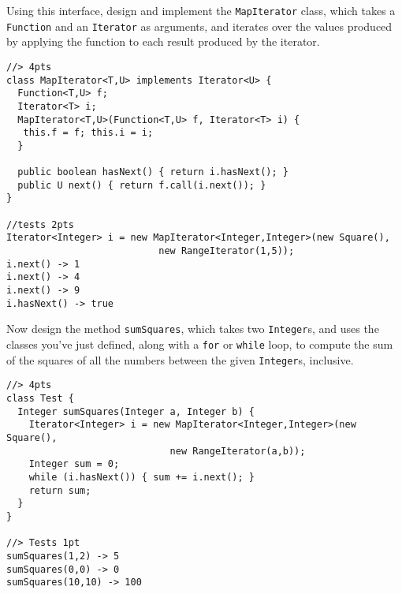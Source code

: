 \documentclass[12pt]{article}                   %
\newenvironment{solution}{\color{red}}{}
\begin{document}
\begin{problem}
Using this interface, design and implement the {\tt MapIterator}
class, which takes a \verb|Function| and an \verb|Iterator| as
arguments, and iterates over the values produced by applying the
function to each result produced by the iterator.

\ifrubric
\begin{solution}
\begin{verbatim}
//> 4pts
class MapIterator<T,U> implements Iterator<U> {
  Function<T,U> f;
  Iterator<T> i;
  MapIterator<T,U>(Function<T,U> f, Iterator<T> i) {
   this.f = f; this.i = i;
  }

  public boolean hasNext() { return i.hasNext(); }
  public U next() { return f.call(i.next()); }
}

//tests 2pts
Iterator<Integer> i = new MapIterator<Integer,Integer>(new Square(), 
                           new RangeIterator(1,5));
i.next() -> 1
i.next() -> 4
i.next() -> 9
i.hasNext() -> true

\end{verbatim}
\end{solution}
\else
\fi
\newpage

\noindent
Now design the method \verb|sumSquares|, which takes two
\verb|Integer|s, and uses the classes you've just defined, along with
a \verb|for| or \verb|while| loop, to compute the sum of the squares
of all the numbers between the given \verb|Integer|s, inclusive.

\ifrubric
\begin{solution}
\begin{verbatim}
//> 4pts
class Test {
  Integer sumSquares(Integer a, Integer b) {
    Iterator<Integer> i = new MapIterator<Integer,Integer>(new Square(), 
                             new RangeIterator(a,b));
    Integer sum = 0;
    while (i.hasNext()) { sum += i.next(); }
    return sum;
  }
}

//> Tests 1pt
sumSquares(1,2) -> 5
sumSquares(0,0) -> 0
sumSquares(10,10) -> 100
\end{verbatim}
\end{solution}
\else
{}
\fi

\end{problem}
\end{document}
